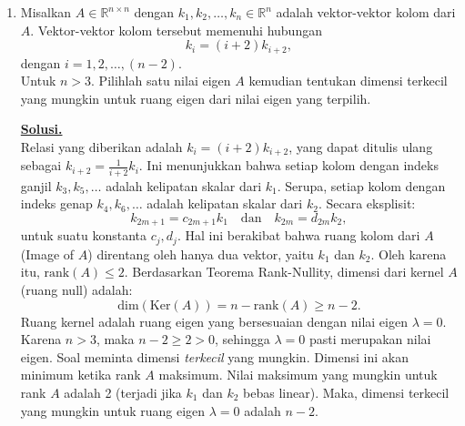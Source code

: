 \documentclass[12pt,twoside]{article}
\newenvironment{solution}
{
	\par\noindent\textbf{\underline{Solusi.}}\\
}
{
	\par
}
\begin{document}
\begin{enumerate}
\begin{solution}
          \textbf{Kesimpulan:} Bilangan bulat yang dicari adalah $\{0, 1, 2, \dots, n^2\}$ untuk $n \ge 2$, dan $\{1\}$ untuk $n=1$.
        \end{solution}


  \item Misalkan $A \in \mathbb{R}^{n\times n}$ dengan $k_1,k_2,\dots,k_n \in \mathbb{R}^n$ adalah vektor-vektor kolom dari $A$. Vektor-vektor kolom tersebut memenuhi hubungan
        \begin{equation*}
          k_i = (i+2)k_{i+2},
        \end{equation*}
        dengan $i = 1,2,\dots,(n-2)$.\\Untuk $n>3$. Pilihlah satu nilai eigen $A$ kemudian tentukan dimensi terkecil yang mungkin untuk ruang eigen dari nilai eigen yang terpilih.

        \begin{solution}
          Relasi yang diberikan adalah $k_i = (i+2) k_{i+2}$, yang dapat ditulis ulang sebagai $k_{i+2} = \frac{1}{i+2} k_i$.
          Ini menunjukkan bahwa setiap kolom dengan indeks ganjil $k_3, k_5, \dots$ adalah kelipatan skalar dari $k_1$.
          Serupa, setiap kolom dengan indeks genap $k_4, k_6, \dots$ adalah kelipatan skalar dari $k_2$.
          Secara eksplisit:
          \[ k_{2m+1} = c_{2m+1} k_1 \quad \text{dan} \quad k_{2m} = d_{2m} k_2, \]
          untuk suatu konstanta $c_j, d_j$.
          Hal ini berakibat bahwa ruang kolom dari $A$ (Image of $A$) direntang oleh hanya dua vektor, yaitu $k_1$ dan $k_2$.
          Oleh karena itu, $\text{rank}(A) \le 2$.
          Berdasarkan Teorema Rank-Nullity, dimensi dari kernel $A$ (ruang null) adalah:
          \[ \text{dim}(\text{Ker}(A)) = n - \text{rank}(A) \ge n-2. \]
          Ruang kernel adalah ruang eigen yang bersesuaian dengan nilai eigen $\lambda = 0$.
          Karena $n > 3$, maka $n-2 \ge 2 > 0$, sehingga $\lambda = 0$ pasti merupakan nilai eigen.
          Soal meminta dimensi \textit{terkecil} yang mungkin. Dimensi ini akan minimum ketika rank $A$ maksimum.
          Nilai maksimum yang mungkin untuk rank $A$ adalah 2 (terjadi jika $k_1$ dan $k_2$ bebas linear).
          Maka, dimensi terkecil yang mungkin untuk ruang eigen $\lambda = 0$ adalah $n-2$.
        \end{solution}



\end{enumerate}
\end{document}
